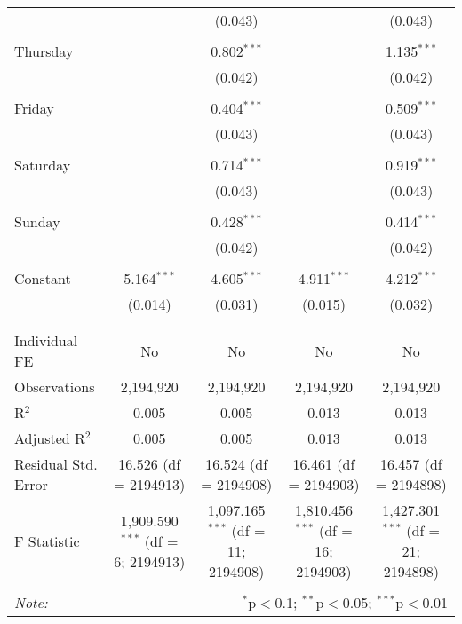 \documentclass[
]{article}
\begin{document}
\begin{table}[!htbp]
{\begin{tabular}{@{\extracolsep{5pt}}lcccc}
  &  & (0.043) &  & (0.043) \\ 
  & & & & \\ 
 Thursday &  & 0.802$^{***}$ &  & 1.135$^{***}$ \\ 
  &  & (0.042) &  & (0.042) \\ 
  & & & & \\ 
 Friday &  & 0.404$^{***}$ &  & 0.509$^{***}$ \\ 
  &  & (0.043) &  & (0.043) \\ 
  & & & & \\ 
 Saturday &  & 0.714$^{***}$ &  & 0.919$^{***}$ \\ 
  &  & (0.043) &  & (0.043) \\ 
  & & & & \\ 
 Sunday &  & 0.428$^{***}$ &  & 0.414$^{***}$ \\ 
  &  & (0.042) &  & (0.042) \\ 
  & & & & \\ 
 Constant & 5.164$^{***}$ & 4.605$^{***}$ & 4.911$^{***}$ & 4.212$^{***}$ \\ 
  & (0.014) & (0.031) & (0.015) & (0.032) \\ 
  & & & & \\ 
\hline \\[-1.8ex] 
Individual FE & No & No & No & No \\ 
Observations & 2,194,920 & 2,194,920 & 2,194,920 & 2,194,920 \\ 
R$^{2}$ & 0.005 & 0.005 & 0.013 & 0.013 \\ 
Adjusted R$^{2}$ & 0.005 & 0.005 & 0.013 & 0.013 \\ 
Residual Std. Error & 16.526 (df = 2194913) & 16.524 (df = 2194908) & 16.461 (df = 2194903) & 16.457 (df = 2194898) \\ 
F Statistic & 1,909.590$^{***}$ (df = 6; 2194913) & 1,097.165$^{***}$ (df = 11; 2194908) & 1,810.456$^{***}$ (df = 16; 2194903) & 1,427.301$^{***}$ (df = 21; 2194898) \\ 
\hline 
\hline \\[-1.8ex] 
\textit{Note:}  & \multicolumn{4}{r}{$^{*}$p$<$0.1; $^{**}$p$<$0.05; $^{***}$p$<$0.01} \\ 
\end{tabular}
} 
\end{table} 
\newpage
\end{document}
